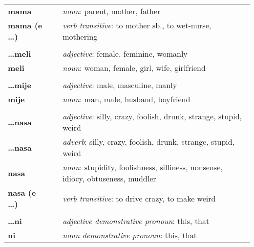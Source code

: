 \begin{supertabular}{p{2,5cm}|ll}
    \textbf{mama}              &  & \textit{noun}: parent, mother, father                                                   \\
    \textbf{mama (e \dots)}    &  & \textit{verb transitive}: to mother sb., to wet-nurse, mothering                        \\
                               &  &                                                                                         \\
    \textbf{\dots meli}        &  & \textit{adjective}: female, feminine, womanly                                           \\
    \textbf{meli}              &  & \textit{noun}: woman, female, girl, wife, girlfriend                                    \\
                               &  &                                                                                         \\
    \textbf{\dots mije}        &  & \textit{adjective}: male, masculine, manly                                              \\
    \textbf{mije}              &  & \textit{noun}: man, male, husband, boyfriend                                            \\
                               &  &                                                                                         \\
    \textbf{\dots nasa}        &  & \textit{adjective}: silly, crazy, foolish, drunk, strange, stupid, weird                \\
    \textbf{\dots nasa}        &  & \textit{adverb}: silly, crazy, foolish, drunk, strange, stupid, weird                   \\
    \textbf{nasa}              &  & \textit{noun}: stupidity, foolishness, silliness, nonsense, idiocy, obtuseness, muddler \\
    \textbf{nasa (e \dots)}    &  & \textit{verb transitive}: to drive crazy, to make weird                                 \\
                               &  &                                                                                         \\
    \textbf{\dots ni}          &  & \textit{adjective demonstrative pronoun}: this, that                                    \\
    \textbf{ni}                &  & \textit{noun demonstrative pronoun}: this, that                                         \\

\end{supertabular}
